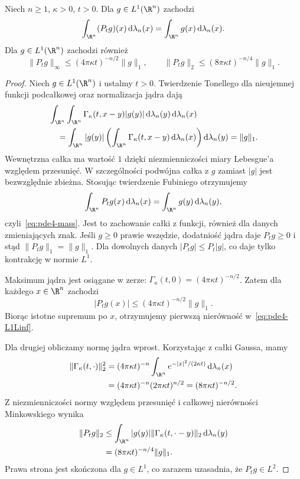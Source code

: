 \begin{stwierdzenie}
\label{prop:pde4-mass}
Niech $n\geq1$, $\kappa>0$, $t>0$.
Dla $g\in L^1(\R^n)$ zachodzi
\begin{equation}\label{eq:pde4-mass}
 \int_{\R^n}(P_tg)(x)\,\mathrm d\lambda_n(x)
 =\int_{\R^n}g(x)\,\mathrm d\lambda_n(x).
\end{equation}
Dla $g\in L^1(\R^n)$ zachodzi również
\begin{equation}\label{eq:pde4-L1Linf}
 \|P_tg\|_\infty\leq (4\pi\kappa t)^{-n/2}\|g\|_1,
 \qquad
 \|P_tg\|_2\leq (8\pi\kappa t)^{-n/4}\|g\|_1.
\end{equation}
\end{stwierdzenie}
\begin{proof}
Niech $g\in L^1(\R^n)$ i ustalmy $t>0$.
Twierdzenie Tonellego dla nieujemnej funkcji
podcałkowej oraz normalizacja jądra dają
\[
 \begin{aligned}
 &\int_{\R^n}\int_{\R^n}\Gamma_\kappa(t,x-y)|g(y)|
       \,\mathrm d\lambda_n(y)\,\mathrm d\lambda_n(x)\\
 &\quad=\int_{\R^n}|g(y)|
   \left(\int_{\R^n}\Gamma_\kappa(t,x-y)\,
                 \mathrm d\lambda_n(x)\right)\mathrm d\lambda_n(y)
 =\|g\|_1.
 \end{aligned}
\]
Wewnętrzna całka ma wartość $1$ dzięki niezmienniczości
miary Lebesgue'a względem przesunięć.
W szczególności podwójna całka z $g$ zamiast
$|g|$ jest bezwzględnie zbieżna. Stosując
twierdzenie Fubiniego otrzymujemy
\[
 \int_{\R^n}P_tg(x)\,\mathrm d\lambda_n(x)
 =\int_{\R^n}g(y)\,\mathrm d\lambda_n(y),
\]
czyli~\eqref{eq:pde4-mass}. Jest to zachowanie
całki z funkcji, również dla danych zmieniających
znak. Jeśli $g\geq0$ prawie wszędzie, dodatniość
jądra daje $P_tg\geq0$ i stąd
$\|P_tg\|_1=\|g\|_1$. Dla dowolnych danych
$|P_tg|\leq P_t|g|$, co daje tylko kontrakcję
w normie $L^1$.

Maksimum jądra jest osiągane w zerze:
$\Gamma_\kappa(t,0)=(4\pi\kappa t)^{-n/2}$.
Zatem dla każdego $x\in\R^n$ zachodzi
\[
 |P_tg(x)|\leq(4\pi\kappa t)^{-n/2}\|g\|_1.
\]
Biorąc istotne supremum po $x$, otrzymujemy
pierwszą nierówność w~\eqref{eq:pde4-L1Linf}.

Dla drugiej obliczamy normę jądra wprost.
Korzystając z całki Gaussa, mamy
\[
 \begin{aligned}
 \|\Gamma_\kappa(t,\cdot)\|_2^2
 &=(4\pi\kappa t)^{-n}
 \int_{\R^n}e^{-|x|^2/(2\kappa t)}\,\mathrm d\lambda_n(x)\\
 &=(4\pi\kappa t)^{-n}(2\pi\kappa t)^{n/2}
 =(8\pi\kappa t)^{-n/2}.
 \end{aligned}
\]
Z niezmienniczości normy względem przesunięć
i całkowej nierówności Minkowskiego wynika
\[
 \begin{aligned}
 \|P_tg\|_2
 &\leq\int_{\R^n}|g(y)|
       \|\Gamma_\kappa(t,\cdot-y)\|_2\,\mathrm d\lambda_n(y)\\
 &= (8\pi\kappa t)^{-n/4}\|g\|_1.
 \end{aligned}
\]
Prawa strona jest skończona dla $g\in L^1$,
co zarazem uzasadnia, że $P_tg\in L^2$.
\end{proof}

